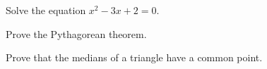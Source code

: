 \begin{schltask}
\item Solve the equation $x^2 - 3x + 2 = 0$.
\item Prove the Pythagorean theorem.
\item Prove that the medians of a triangle have a common point.
\end{schltask}
